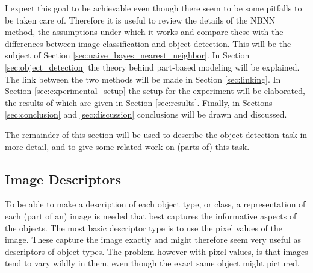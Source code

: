 \documentclass[a4paper,10pt]{article}
\begin{document}
I expect this goal to be achievable even though there seem to be some pitfalls to be taken care of. Therefore it is useful to review the details of the NBNN method, the assumptions under which it works and compare these with the differences between image classification and object detection. This will be the subject of Section \ref{sec:naive_bayes_nearest_neighbor}. In Section \ref{sec:object_detection} the theory behind part-based modeling will be explained. The link between the two methods will be made in Section \ref{sec:linking}. In Section \ref{sec:experimental_setup} the setup for the experiment will be elaborated, the results of which are given in Section \ref{sec:results}. Finally, in Sections \ref{sec:conclusion} and \ref{sec:discussion} conclusions will be drawn and discussed.

The remainder of this section will be used to describe the object detection task in more detail, and to give some related work on (parts of) this task. 

\subsection{Image Descriptors} %
\label{sub:image_descriptors}
To be able to make a description of each object type, or class, a representation of each (part of an) image is needed that best captures the informative aspects of the objects. The most basic descriptor type is to use the pixel values of the image. These capture the image exactly and might therefore seem very useful as descriptors of object types. The problem however with pixel values, is that images tend to vary wildly in them, even though the exact same object might pictured.
\end{document}
